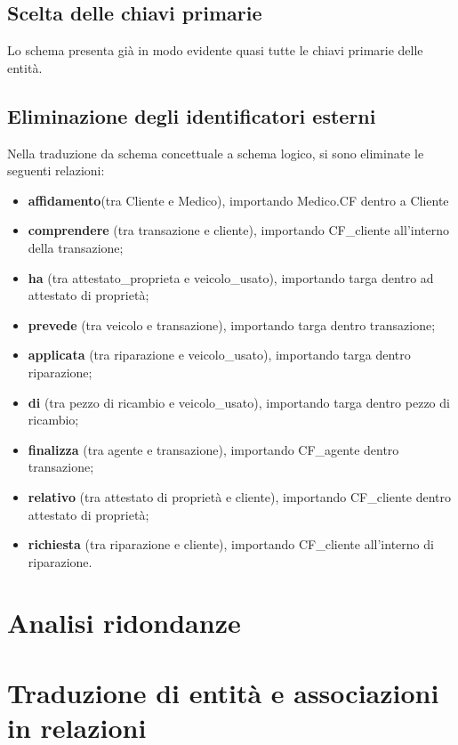 \documentclass[a4paper,12pt]{report}
\begin{document}
\subsection*{Scelta delle chiavi primarie }
Lo schema presenta già in modo evidente quasi tutte le chiavi primarie delle entità.

\subsection*{Eliminazione degli identificatori esterni }
Nella traduzione da schema concettuale a schema logico, si sono eliminate le seguenti relazioni: 

\begin{itemize}
	\item \textbf{affidamento}(tra Cliente e Medico), importando Medico.CF dentro a Cliente 
	\item \textbf{comprendere} (tra transazione e cliente), importando CF\_cliente all’interno della transazione;
	\item \textbf{ha} (tra attestato\_proprieta e veicolo\_usato), importando targa dentro ad attestato di proprietà;
	\item \textbf{prevede} (tra veicolo e transazione), importando targa dentro transazione;
	\item \textbf{applicata} (tra riparazione e veicolo\_usato), importando targa dentro riparazione;
	\item \textbf{di} (tra pezzo di ricambio e veicolo\_usato), importando targa dentro pezzo di ricambio;
	\item \textbf{finalizza} (tra agente e transazione), importando CF\_agente dentro transazione;
	\item \textbf{relativo} (tra attestato di proprietà e cliente), importando CF\_cliente dentro attestato di proprietà;
	\item \textbf{richiesta} (tra riparazione e cliente), importando CF\_cliente all’interno di riparazione.
\end{itemize}

\section{Analisi ridondanze}

\section{Traduzione di entità e associazioni in relazioni}
\end{document}
